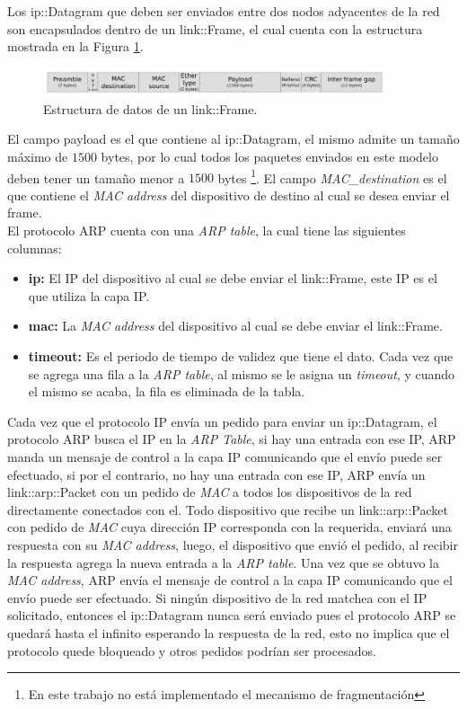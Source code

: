 \documentclass[10pt,a4paper]{article}
\begin{document}
Los ip::Datagram que deben ser enviados entre dos nodos adyacentes de la red son encapsulados dentro de un link::Frame, el cual cuenta con la estructura mostrada en la Figura \ref{figure: frame structure}. \\

\begin{figure}[!htb]
    \centering
    \includegraphics[width = 0.9\textwidth]{img/png/l2-frame.png}
    \caption{Estructura de datos de un link::Frame.}
    \label{figure: frame structure}
\end{figure}

El campo payload es el que contiene al ip::Datagram, el mismo admite un tamaño máximo de $1500$ bytes, por lo cual todos los paquetes enviados en este modelo deben tener un tamaño menor a $1500$ bytes \footnote{En este trabajo no está implementado el mecanismo de fragmentación}. El campo \textit{MAC\_destination} es el que contiene el \textit{MAC address} del dispositivo de destino al cual se desea enviar el frame.\\

El protocolo ARP cuenta con una \textit{ARP table}, la cual tiene las siguientes columnas:

\begin{itemize}
\item \textbf{ip:} El IP del dispositivo al cual se debe enviar el link::Frame, este IP es el que utiliza la capa IP.
\item \textbf{mac:} La \textit{MAC address} del dispositivo al cual se debe enviar el link::Frame.
\item \textbf{timeout:} Es el periodo de tiempo de validez que tiene el dato. Cada vez que se agrega una fila a la \textit{ARP table}, al mismo se le asigna un \textit{timeout}, y cuando el mismo se acaba, la fila es eliminada de la tabla.
\end{itemize}

Cada vez que el protocolo IP envía un pedido para enviar un ip::Datagram, el protocolo ARP busca el IP en la \textit{ARP Table}, si hay una entrada con ese IP, ARP manda un mensaje de control a la capa IP comunicando que el envío puede ser efectuado, si por el contrario, no hay una entrada con ese IP, ARP envía un link::arp::Packet con un pedido de \textit{MAC} a todos los dispositivos de la red directamente conectados con el. Todo dispositivo que recibe un link::arp::Packet con pedido de \textit{MAC} cuya dirección IP corresponda con la requerida, enviará una respuesta con su \textit{MAC address}, luego, el dispositivo que envió el pedido, al recibir la respuesta agrega la nueva entrada a la \textit{ARP table}. Una vez que se obtuvo la \textit{MAC address}, ARP envía el mensaje de control a la capa IP comunicando que el envío puede ser efectuado. Si ningún dispositivo de la red matchea con el IP solicitado, entonces el ip::Datagram nunca será enviado pues el protocolo ARP se quedará hasta el infinito esperando la respuesta de la red, esto no implica que el protocolo quede bloqueado y otros pedidos podrían ser procesados.\\
\end{document}
